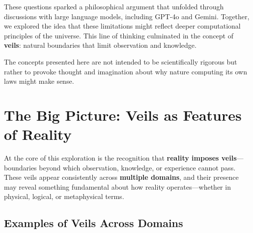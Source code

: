 \documentclass[12pt]{article}
\begin{document}
These questions sparked a philosophical argument that unfolded through discussions with large language models, including GPT-4o and Gemini. Together, we explored the idea that these limitations might reflect deeper computational principles of the universe. This line of thinking culminated in the concept of \textbf{veils}: natural boundaries that limit observation and knowledge.

The concepts presented here are not intended to be scientifically rigorous but rather to provoke thought and imagination about why nature computing its own laws might make sense.


\section{The Big Picture: Veils as Features of Reality}

At the core of this exploration is the recognition that \textbf{reality imposes veils}—boundaries beyond which observation, knowledge, or experience cannot pass. These veils appear consistently across \textbf{multiple domains}, and their presence may reveal something fundamental about how reality operates—whether in physical, logical, or metaphysical terms.

\subsection{Examples of Veils Across Domains}
\end{document}
